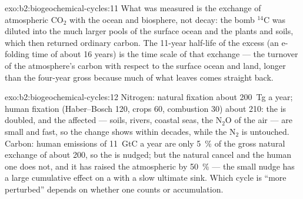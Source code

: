 \begin{solution}{exo:b2:biogeochemical-cycles:11}
What was measured is the exchange of atmospheric $\mathrm{CO_2}$ with the
ocean and biosphere, not decay: the bomb $\mathrm{{}^{14}C}$ was diluted
into the much larger pools of the surface ocean and the plants and
soils, which then returned ordinary carbon. The 11-year half-life
of the excess (an e-folding time of about 16 years) is the time
scale of that exchange --- the turnover of the atmosphere's carbon
with respect to the surface ocean and land, longer than the
four-year gross  because much of what leaves comes
straight back.
\end{solution}

\begin{solution}{exo:b2:biogeochemical-cycles:12}
Nitrogen: natural fixation about 200~Tg a year; human fixation
(Haber--Bosch 120, crops 60, combustion 30) about 210: the  is
doubled, and the  affected --- soils, rivers, coastal
seas, the $\mathrm{N_2O}$ of the air --- are small and fast, so the change
shows within decades, while the $\mathrm{N_2}$  is untouched.
Carbon: human emissions of 11~GtC a year are only \qty{5}{\%} of
the gross natural exchange of about 200, so the  is nudged;
but the natural  cancel and the human one does not, and it
has raised the atmospheric  by \qty{50}{\%} --- the small
nudge has a large cumulative effect on a  with a slow
ultimate sink. Which cycle is ``more perturbed'' depends on whether
one counts  or accumulation.
\end{solution}

